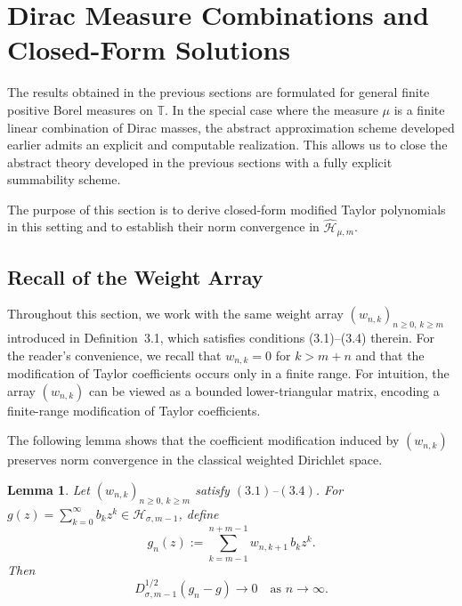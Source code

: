 \documentclass[12pt,reqno]{amsart}
\newtheorem{lemma}[theorem]{Lemma}
\begin{document}
\section{Dirac Measure Combinations and Closed-Form Solutions}

The results obtained in the previous sections are formulated for general finite positive Borel measures on $\mathbb{T}$.
In the special case where the measure $\mu$ is a finite linear combination of Dirac masses, the abstract approximation scheme developed earlier admits an explicit and computable realization. This allows us to close the abstract theory developed in the previous sections with a fully explicit summability scheme.

The purpose of this section is to derive closed-form modified Taylor polynomials in this setting and to establish their norm convergence in $\widehat{\mathcal{H}}_{\mu,m}$.

\subsection*{Recall of the Weight Array}

Throughout this section, we work with the same weight array
$(w_{n,k})_{n\ge0,\,k\ge m}$ introduced in Definition~3.1,
which satisfies conditions (3.1)--(3.4) therein.
For the reader's convenience, we recall that $w_{n,k}=0$ for $k>m+n$
and that the modification of Taylor coefficients occurs only in a finite range. For intuition, the array $(w_{n,k})$ can be viewed as a bounded lower-triangular matrix, encoding a finite-range modification of Taylor coefficients.

The following lemma shows that the coefficient modification induced by
$(w_{n,k})$ preserves norm convergence in the classical weighted Dirichlet space.

\begin{lemma}\label{lm5.2}
Let \( (w_{n,k})_{n \ge 0,\, k \ge m} \) satisfy \((3.1)\)--\((3.4)\).
For \( g(z)=\sum_{k=0}^{\infty} b_k z^k \in \mathcal{H}_{\sigma,m-1} \), define
\[
g_n(z):=\sum_{k=m-1}^{n+m-1} w_{n,k+1}\, b_k z^k.
\]
Then
\[
D_{\sigma,m-1}^{1/2}(g_n-g)\to 0
\quad\text{as } n\to\infty.
\tag{4.1}
\]
\end{lemma}
\end{document}
